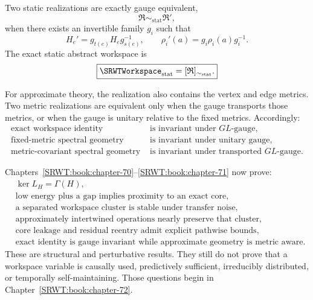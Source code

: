 \begin{SRWTdefinition}\label{SRWT:def:static-equivalence}
Two static realizations are exactly gauge equivalent,
\[
\mathfrak R\sim_{\mathrm{stat}}\mathfrak R',
\]
when there exists an invertible family \(g_i\) such that
\[
H_e'=g_{t(e)}H_eg_{s(e)}^{-1},
\qquad
\rho_i'(a)=g_i\rho_i(a)g_i^{-1}.
\]
The exact static abstract workspace is
\[
\boxed{
\SRWTWorkspace_{\mathrm{stat}}
=
[\mathfrak R]_{\sim_{\mathrm{stat}}}.
}
\]
\end{SRWTdefinition}

For approximate theory, the realization also contains the vertex and edge
metrics. Two metric realizations are equivalent only when the gauge transports
those metrics, or when the gauge is unitary relative to the fixed metrics.
Accordingly:
\[
\boxed{
\begin{aligned}
\text{exact workspace identity}
&\text{ is invariant under }GL\text{-gauge},\\
\text{fixed-metric spectral geometry}
&\text{ is invariant under unitary gauge},\\
\text{metric-covariant spectral geometry}
&\text{ is invariant under transported }GL\text{-gauge}.
\end{aligned}
}
\]



Chapters~\ref{SRWT:book:chapter-70}--\ref{SRWT:book:chapter-71} now prove:
\[
\begin{aligned}
&\ker L_H=\Gamma(H),\\
&\text{low energy plus a gap implies proximity to an exact core},\\
&\text{a separated workspace cluster is stable under transfer noise},\\
&\text{approximately intertwined operations nearly preserve that cluster},\\
&\text{core leakage and residual reentry admit explicit pathwise bounds},\\
&\text{exact identity is gauge invariant while approximate geometry is metric aware}.
\end{aligned}
\]
These are structural and perturbative results. They still do not prove that a
workspace variable is causally used, predictively sufficient, irreducibly
distributed, or temporally self-maintaining. Those questions begin in
Chapter~\ref{SRWT:book:chapter-72}.


